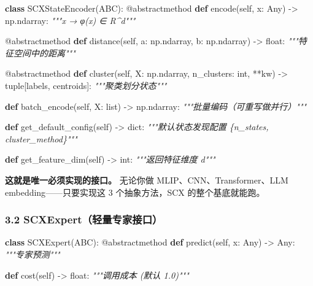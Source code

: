 \documentclass[
  12pt,
]{ctexart}
\newenvironment{Shaded}{}{}
\newcommand{\AttributeTok}[1]{\textcolor[rgb]{0.49,0.56,0.16}{#1}}
\newcommand{\BuiltInTok}[1]{\textcolor[rgb]{0.00,0.50,0.00}{#1}}
\newcommand{\CommentTok}[1]{\textcolor[rgb]{0.38,0.63,0.69}{\textit{#1}}}
\newcommand{\KeywordTok}[1]{\textcolor[rgb]{0.00,0.44,0.13}{\textbf{#1}}}
\newcommand{\NormalTok}[1]{#1}
\newcommand{\OperatorTok}[1]{\textcolor[rgb]{0.40,0.40,0.40}{#1}}
\newcommand{\VariableTok}[1]{\textcolor[rgb]{0.10,0.09,0.49}{#1}}
\begin{document}
\begin{Shaded}
\begin{Highlighting}[]
\KeywordTok{class}\NormalTok{ SCXStateEncoder(ABC):}
    \AttributeTok{@abstractmethod}
    \KeywordTok{def}\NormalTok{ encode(}\VariableTok{self}\NormalTok{, x: Any) }\OperatorTok{{-}\textgreater{}}\NormalTok{ np.ndarray:}
        \CommentTok{"""x → φ(x) ∈ R\^{}d"""}

    \AttributeTok{@abstractmethod}
    \KeywordTok{def}\NormalTok{ distance(}\VariableTok{self}\NormalTok{, a: np.ndarray, b: np.ndarray) }\OperatorTok{{-}\textgreater{}} \BuiltInTok{float}\NormalTok{:}
        \CommentTok{"""特征空间中的距离"""}

    \AttributeTok{@abstractmethod}
    \KeywordTok{def}\NormalTok{ cluster(}\VariableTok{self}\NormalTok{, X: np.ndarray, n\_clusters: }\BuiltInTok{int}\NormalTok{, }\OperatorTok{**}\NormalTok{kw) }\OperatorTok{{-}\textgreater{}} \BuiltInTok{tuple}\NormalTok{[labels, centroids]:}
        \CommentTok{"""聚类划分状态"""}

    \KeywordTok{def}\NormalTok{ batch\_encode(}\VariableTok{self}\NormalTok{, X: }\BuiltInTok{list}\NormalTok{) }\OperatorTok{{-}\textgreater{}}\NormalTok{ np.ndarray:}
        \CommentTok{"""批量编码（可重写做并行）"""}

    \KeywordTok{def}\NormalTok{ get\_default\_config(}\VariableTok{self}\NormalTok{) }\OperatorTok{{-}\textgreater{}} \BuiltInTok{dict}\NormalTok{:}
        \CommentTok{"""默认状态发现配置 \{n\_states, cluster\_method\}"""}

    \KeywordTok{def}\NormalTok{ get\_feature\_dim(}\VariableTok{self}\NormalTok{) }\OperatorTok{{-}\textgreater{}} \BuiltInTok{int}\NormalTok{:}
        \CommentTok{"""返回特征维度 d"""}
\end{Highlighting}
\end{Shaded}

\textbf{这就是唯一必须实现的接口。} 无论你做 MLIP、CNN、Transformer、LLM
embedding------只要实现这 3 个抽象方法，SCX 的整个基底就能跑。

\subsubsection{3.2
SCXExpert（轻量专家接口）}\label{scxexpertux8f7bux91cfux4e13ux5bb6ux63a5ux53e3}

\begin{Shaded}
\begin{Highlighting}[]
\KeywordTok{class}\NormalTok{ SCXExpert(ABC):}
    \AttributeTok{@abstractmethod}
    \KeywordTok{def}\NormalTok{ predict(}\VariableTok{self}\NormalTok{, x: Any) }\OperatorTok{{-}\textgreater{}}\NormalTok{ Any:}
        \CommentTok{"""专家预测"""}

    \KeywordTok{def}\NormalTok{ cost(}\VariableTok{self}\NormalTok{) }\OperatorTok{{-}\textgreater{}} \BuiltInTok{float}\NormalTok{:}
        \CommentTok{"""调用成本 (默认 1.0)"""}
\end{Highlighting}
\end{Shaded}
\end{document}
